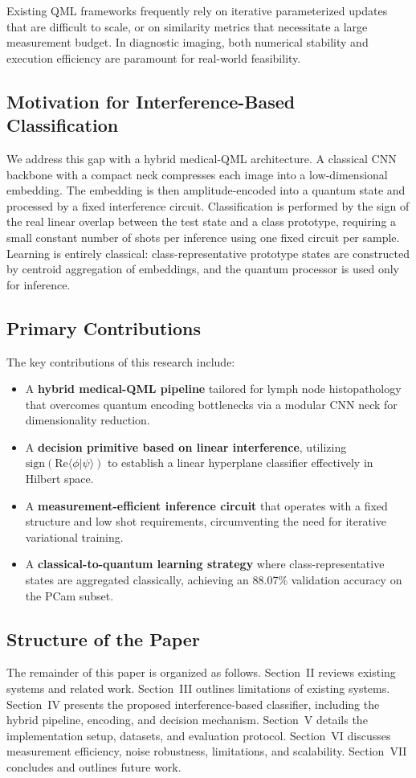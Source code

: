 \documentclass[conference]{IEEEtran}
\begin{document}
Existing QML frameworks frequently rely on iterative parameterized updates that are difficult to scale, or on similarity metrics that necessitate a large measurement budget. In diagnostic imaging, both numerical stability and execution efficiency are paramount for real-world feasibility.

\subsection{Motivation for Interference-Based Classification}
We address this gap with a hybrid medical-QML architecture. A classical CNN backbone with a compact neck compresses each image into a low-dimensional embedding. The embedding is then amplitude-encoded into a quantum state and processed by a fixed interference circuit. Classification is performed by the sign of the real linear overlap between the test state and a class prototype, requiring a small constant number of shots per inference using one fixed circuit per sample. Learning is entirely classical: class-representative prototype states are constructed by centroid aggregation of embeddings, and the quantum processor is used only for inference.

\subsection{Primary Contributions}
The key contributions of this research include:
\begin{itemize}
    \item A \textbf{hybrid medical-QML pipeline} tailored for lymph node histopathology that overcomes quantum encoding bottlenecks via a modular CNN neck for dimensionality reduction.
    \item A \textbf{decision primitive based on linear interference}, utilizing $\mathrm{sign}(\mathrm{Re}\langle\phi|\psi\rangle)$ to establish a linear hyperplane classifier effectively in Hilbert space.
    \item A \textbf{measurement-efficient inference circuit} that operates with a fixed structure and low shot requirements, circumventing the need for iterative variational training.
    \item A \textbf{classical-to-quantum learning strategy} where class-representative states are aggregated classically, achieving an 88.07\% validation accuracy on the PCam subset.
\end{itemize}

\subsection{Structure of the Paper}
The remainder of this paper is organized as follows. Section~II reviews existing systems and related work. Section~III outlines limitations of existing systems. Section~IV presents the proposed interference-based classifier, including the hybrid pipeline, encoding, and decision mechanism. Section~V details the implementation setup, datasets, and evaluation protocol. Section~VI discusses measurement efficiency, noise robustness, limitations, and scalability. Section~VII concludes and outlines future work.
\end{document}
